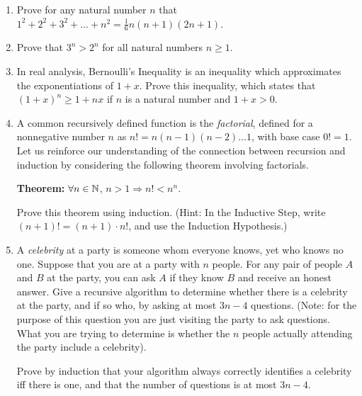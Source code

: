 \documentclass[11pt]{article}
\newcounter{thm}
\begin{document}
\begin{enumerate}

\item Prove for any natural number $n$ that $1^2 + 2^2 + 3^2 + \ldots + n^2 = \frac{1}{6}n(n+1)(2n+1)$.

\item Prove that $3^n > 2^n$ for all natural numbers $n \geq 1$.

\item In real analysis, Bernoulli's Inequality is an inequality which approximates the exponentiations of $1+x$.
Prove this inequality, which states that $(1+x)^n \geq 1+nx$ if $n$ is a natural number and $1+x > 0$.


\item A common recursively defined function is the \emph{factorial}, defined for a nonnegative number $n$ as $n! = n(n-1)(n-2)...1$, with base case $0! = 1$. Let us reinforce our understanding of the connection between recursion and induction by considering the following theorem involving factorials.


{\bf Theorem: } $\forall n \in \mathbb{N}$, $n > 1 \Longrightarrow n! < n^n$.

Prove this theorem using induction. (Hint: In the Inductive Step, write $(n+1)!=(n+1)\cdot n!$, and use the Induction Hypothesis.)

\item A \emph{celebrity} at a party is someone whom everyone knows, yet who knows no
one.  Suppose that you are at a party with $n$ people.  For any pair of people
$A$ and $B$ at the party, you can ask $A$ if they know $B$ and receive an honest
answer.  Give a recursive algorithm to determine whether there is a celebrity at
the party, and if so who, by asking at most $3n - 4$ questions. (Note: for the
purpose of this question you are just visiting the party to ask questions. What
you are trying to determine is whether the $n$ people actually attending the
party include a celebrity).

Prove by induction that your algorithm always correctly identifies a celebrity
iff there is one, and that the number of questions is at most $3n-4$.

\end{enumerate}
\end{document}
